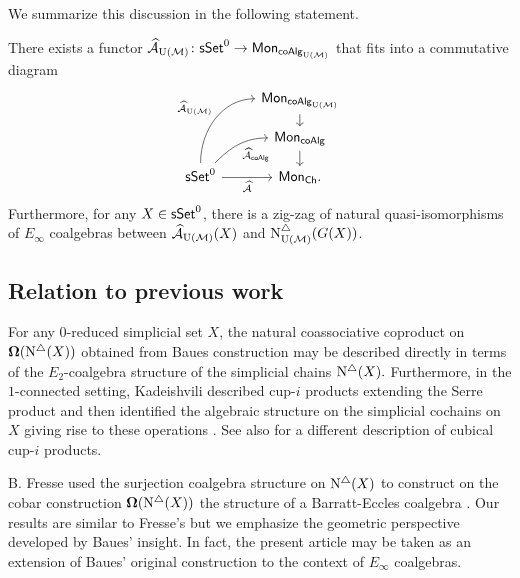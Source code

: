 We summarize this discussion in the following statement.

\begin{theorem} \label{t:2nd main thm in the intro} There exists a functor $\operatorname{\mathcal{\widehat{A}}}_{\operatorname{U}(\mathcal{M})} \colon \mathsf{sSet}^0 \to \mathsf{Mon}_{\mathsf{coAlg}_{\operatorname{U}(\mathcal{M})}}$ that fits into a commutative diagram
	\begin{equation*}
	\begin{tikzcd}[row sep=small]
	& \Mon_{\coAlg_\UM} \arrow[d] \\
	& \Mon_{\coAlg} \arrow[d] \\
	\sSet^0
	\arrow[r, "\Ahat"', ]
	\arrow[ru, "\Ahat_{\coAlg}"', out=45, in=180] 
	\arrow[ruu, "\Ahat_\UM", out=90, in=180]
	& \Mon_{\Ch}.
	\end{tikzcd}
	\end{equation*}
	Furthermore, for any $X \in \mathsf{sSet}^0$, there is a zig-zag of natural quasi-isomorphisms of $E_{\infty}$ coalgebras between $\operatorname{\mathcal{\widehat{A}}}_{\operatorname{U}(\mathcal{M})}(X)$ and $\operatorname{N^{\triangle}_{{\operatorname{U}(\mathcal{M})}}}(G(X))$.
\end{theorem}

\subsection*{Relation to previous work}

For any $0$-reduced simplicial set $X$, the natural coassociative coproduct on $\operatorname{\mathbf{\Omega}} (\operatorname{N^{\triangle}} (X))$ obtained from Baues construction may be described directly in terms of the $E_2$-coalgebra structure of the simplicial chains $\operatorname{N^{\triangle}}(X).$ Furthermore, in the $1$-connected setting, Kadeishvili described cup-$i$ products extending the Serre product and then identified the algebraic structure on the simplicial cochains on $X$ giving rise to these operations \cite{kadeishvili1999coproducts, kadeishvili2003cup-i}.
See also \cite{pilarczyk2016cubical} for a different description of cubical cup-$i$ products.

B. Fresse used the surjection coalgebra structure on $\operatorname{N^{\triangle}}(X)$ to construct on the cobar construction $\operatorname{\mathbf{\Omega}}(\operatorname{N^{\triangle}}(X))$ the  structure of a Barratt-Eccles coalgebra \cite{fresse2003hopf}.
Our results are similar to Fresse's but we emphasize the geometric perspective developed by Baues' insight.
In fact, the present article may be taken as an extension of Baues' original construction to the context of $E_{\infty}$ coalgebras.

